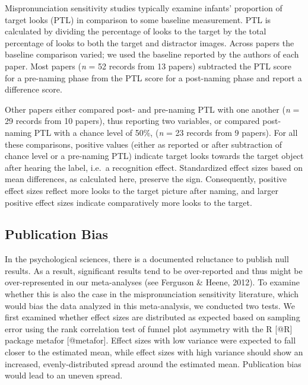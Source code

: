 \documentclass[man]{apa6}
\theoremstyle{definition}
\theoremstyle{definition}
\theoremstyle{definition}
\theoremstyle{remark}
\begin{document}
Mispronunciation sensitivity studies typically examine infants'
proportion of target looks (PTL) in comparison to some baseline
measurement. PTL is calculated by dividing the percentage of looks to
the target by the total percentage of looks to both the target and
distractor images. Across papers the baseline comparison varied; we used
the baseline reported by the authors of each paper. Most papers
(\emph{n} = 52 records from 13 papers) subtracted the PTL score for a
pre-naming phase from the PTL score for a post-naming phase and report a
difference score.

Other papers either compared post- and pre-naming PTL with one another
(\emph{n} = 29 records from 10 papers), thus reporting two variables, or
compared post-naming PTL with a chance level of 50\%, (\emph{n} = 23
records from 9 papers). For all these comparisons, positive values
(either as reported or after subtraction of chance level or a pre-naming
PTL) indicate target looks towards the target object after hearing the
label, i.e.~a recognition effect. Standardized effect sizes based on
mean differences, as calculated here, preserve the sign. Consequently,
positive effect sizes reflect more looks to the target picture after
naming, and larger positive effect sizes indicate comparatively more
looks to the target.

\subsection{Publication Bias}\label{publication-bias}

In the psychological sciences, there is a documented reluctance to
publish null results. As a result, significant results tend to be
over-reported and thus might be over-represented in our meta-analyses
(see Ferguson \& Heene, 2012). To examine whether this is also the case
in the mispronunciation sensitivity literature, which would bias the
data analyzed in this meta-analysis, we conducted two tests. We first
examined whether effect sizes are distributed as expected based on
sampling error using the rank correlation test of funnel plot asymmetry
with the R {[}@R{]} package metafor {[}@metafor{]}. Effect sizes with
low variance were expected to fall closer to the estimated mean, while
effect sizes with high variance should show an increased,
evenly-distributed spread around the estimated mean. Publication bias
would lead to an uneven spread.
\end{document}
